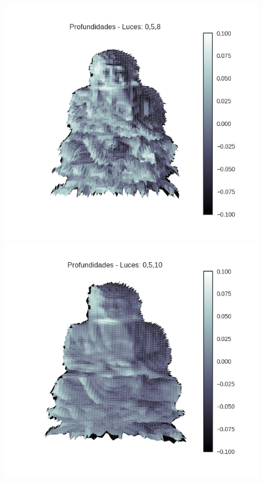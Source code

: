 \begin{figure}[H]
\centering
\begin{minipage}{.5\textwidth}
  \centering
  \includegraphics[width=1\linewidth]{informe/imagenes/profundidades/buda058.png}
\end{minipage}%
\begin{minipage}{.5\textwidth}
  \centering
    \includegraphics[width=1\linewidth]{informe/imagenes/profundidades/buda0510.png}
\end{minipage}
\end{figure}


